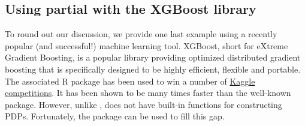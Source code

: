 \subsection{Using partial with the XGBoost library}
\label{sec:xgboost}

To round out our discussion, we provide one last example using a recently popular (and successful!) machine learning tool. XGBoost, short for eXtreme Gradient Boosting, is a popular library providing optimized distributed gradient boosting that is specifically designed to be highly efficient, flexible and portable. The associated R package  has been used to win a number of \href{https://www.kaggle.com/}{Kaggle competitions}. It has been shown to be many times faster than the well-known  package. However, unlike ,  does not have built-in functions for constructing PDPs. Fortunately, the  package can be used to fill this gap.


